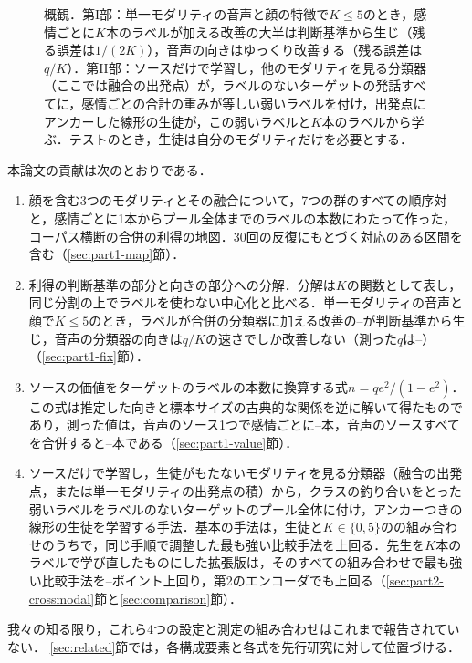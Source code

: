 \begin{figure}[t]
\centering
{}
\caption{概観．第I部：単一モダリティの音声と顔の特徴で$K \le 5$のとき，感情ごとに$K$本のラベルが加える改善の大半は判断基準から生じ（残る誤差は$1/(2K)$），音声の向きはゆっくり改善する（残る誤差は$q/K$）．第II部：ソースだけで学習し，他のモダリティを見る分類器（ここでは融合の出発点）が，ラベルのないターゲットの発話すべてに，感情ごとの合計の重みが等しい弱いラベルを付け，出発点にアンカーした線形の生徒が，この弱いラベルと$K$本のラベルから学ぶ．テストのとき，生徒は自分のモダリティだけを必要とする．}
\label{fig:overview}
\end{figure}

本論文の貢献は次のとおりである．
\begin{enumerate}
\item 顔を含む3つのモダリティとその融合について，7つの群のすべての順序対と，感情ごとに1本からプール全体までのラベルの本数にわたって作った，コーパス横断の合併の利得の地図．30回の反復にもとづく対応のある区間を含む（\ref{sec:part1-map}節）．
\item 利得の判断基準の部分と向きの部分への分解．分解は$K$の関数として表し，同じ分割の上でラベルを使わない中心化と比べる．単一モダリティの音声と顔で$K \le 5$のとき，ラベルが合併の分類器に加える改善の--が判断基準から生じ，音声の分類器の向きは$q/K$の速さでしか改善しない（測った$q$は--）（\ref{sec:part1-fix}節）．
\item ソースの価値をターゲットのラベルの本数に換算する式$n = q e^2/(1-e^2)$．この式は推定した向きと標本サイズの古典的な関係を逆に解いて得たものであり，測った値は，音声のソース1つで感情ごとに--本，音声のソースすべてを合併すると--本である（\ref{sec:part1-value}節）．
\item ソースだけで学習し，生徒がもたないモダリティを見る分類器（融合の出発点，または単一モダリティの出発点の積）から，クラスの釣り合いをとった弱いラベルをラベルのないターゲットのプール全体に付け，アンカーつきの線形の生徒を学習する手法．基本の手法は，生徒と$K \in \{0, 5\}$のの組み合わせのうちで，同じ手順で調整した最も強い比較手法を上回る．先生を$K$本のラベルで学び直したものにした拡張版は，そのすべての組み合わせで最も強い比較手法を--ポイント上回り，第2のエンコーダでも上回る（\ref{sec:part2-crossmodal}節と\ref{sec:comparison}節）．
\end{enumerate}
我々の知る限り，これら4つの設定と測定の組み合わせはこれまで報告されていない．
\ref{sec:related}節では，各構成要素と各式を先行研究に対して位置づける．
